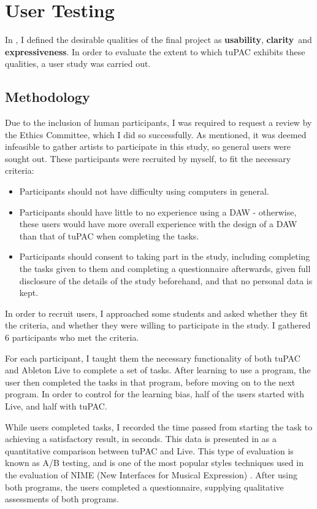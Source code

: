 \documentclass[12pt,a4paper,oneside,openright]{report}
\newcommand{\usability}{\textbf{usability}}
\newcommand{\clarity}{\textbf{clarity}}
\newcommand{\expressiveness}{\textbf{expressiveness}}
\begin{document}
\section{User Testing}
In , I defined the desirable qualities of the final project as \usability, \clarity\ and \expressiveness. In order to evaluate the extent to which tuPAC exhibits these qualities, a user study was carried out.

\subsection{Methodology}
Due to the inclusion of human participants, I was required to request a review by the Ethics Committee, which I did so successfully. As mentioned, it was deemed infeasible to gather artists to participate in this study, so general users were sought out. These participants were recruited by myself, to fit the necessary criteria:
\begin{itemize}
    \item Participants should not have difficulty using computers in general.
    \item Participants should have little to no experience using a DAW - otherwise, these users would have more overall experience with the design of a DAW than that of tuPAC when completing the tasks.
    \item Participants should consent to taking part in the study, including completing the tasks given to them and completing a questionnaire afterwards, given full disclosure of the details of the study beforehand, and that no personal data is kept.
\end{itemize}

In order to recruit users, I approached some students and asked whether they fit the criteria, and whether they were willing to participate in the study. I gathered 6 participants who met the criteria.

For each participant, I taught them the necessary functionality of both tuPAC and Ableton Live to complete a set of tasks. After learning to use a program, the user then completed the tasks in that program, before moving on to the next program. In order to control for the learning bias, half of the users started with Live, and half with tuPAC.

While users completed tasks, I recorded the time passed from starting the task to achieving a satisfactory result, in seconds. This data is presented in  as a quantitative comparison between tuPAC and Live. This type of evaluation is known as A/B testing, and is one of the most popular styles techniques used in the evaluation of NIME (New Interfaces for Musical Expression) \cite{Huot15}. After using both programs, the users completed a questionnaire, supplying qualitative assessments of both programs.
\end{document}
